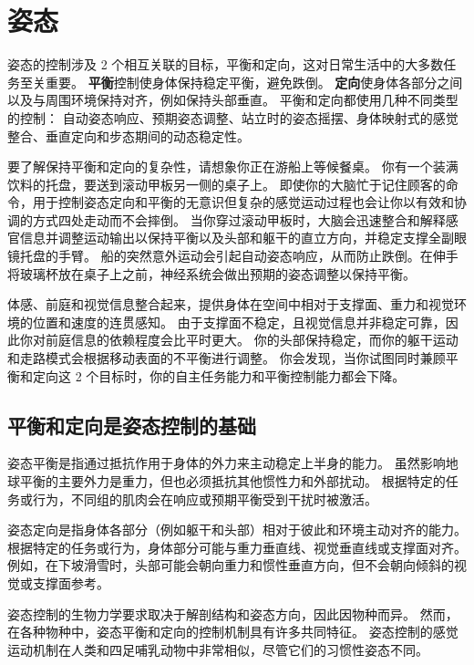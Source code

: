 \chapter{姿态} \label{chap:chap36}

姿态的控制涉及 2 个相互关联的目标，平衡和定向，这对日常生活中的大多数任务至关重要。
\textbf{平衡}控制使身体保持稳定平衡，避免跌倒。
\textbf{定向}使身体各部分之间以及与周围环境保持对齐，例如保持头部垂直。
平衡和定向都使用几种不同类型的控制：
自动姿态响应、预期姿态调整、站立时的姿态摇摆、身体映射式的感觉整合、垂直定向和步态期间的动态稳定性。


要了解保持平衡和定向的复杂性，请想象你正在游船上等候餐桌。
你有一个装满饮料的托盘，要送到滚动甲板另一侧的桌子上。
即使你的大脑忙于记住顾客的命令，用于控制姿态定向和平衡的无意识但复杂的感觉运动过程也会让你以有效和协调的方式四处走动而不会摔倒。
当你穿过滚动甲板时，大脑会迅速整合和解释感官信息并调整运动输出以保持平衡以及头部和躯干的直立方向，并稳定支撑全副眼镜托盘的手臂。
船的突然意外运动会引起自动姿态响应，从而防止跌倒。在伸手将玻璃杯放在桌子上之前，神经系统会做出预期的姿态调整以保持平衡。


体感、前庭和视觉信息整合起来，提供身体在空间中相对于支撑面、重力和视觉环境的位置和速度的连贯感知。
由于支撑面不稳定，且视觉信息并非稳定可靠，因此你对前庭信息的依赖程度会比平时更大。
你的头部保持稳定，而你的躯干运动和走路模式会根据移动表面的不平衡进行调整。
你会发现，当你试图同时兼顾平衡和定向这 2 个目标时，你的自主任务能力和平衡控制能力都会下降。



\section{平衡和定向是姿态控制的基础}

姿态平衡是指通过抵抗作用于身体的外力来主动稳定上半身的能力。
虽然影响地球平衡的主要外力是重力，但也必须抵抗其他惯性力和外部扰动。
根据特定的任务或行为，不同组的肌肉会在响应或预期平衡受到干扰时被激活。


姿态定向是指身体各部分（例如躯干和头部）相对于彼此和环境主动对齐的能力。
根据特定的任务或行为，身体部分可能与重力垂直线、视觉垂直线或支撑面对齐。
例如，在下坡滑雪时，头部可能会朝向重力和惯性垂直方向，但不会朝向倾斜的视觉或支撑面参考。


姿态控制的生物力学要求取决于解剖结构和姿态方向，因此因物种而异。
然而，在各种物种中，姿态平衡和定向的控制机制具有许多共同特征。
姿态控制的感觉运动机制在人类和四足哺乳动物中非常相似，尽管它们的习惯性姿态不同。



